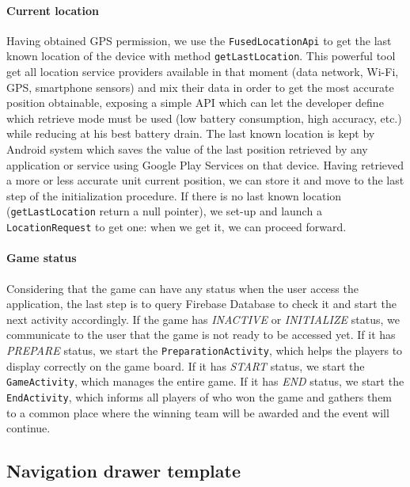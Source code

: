 			\paragraph{Current location}
			
			Having obtained GPS permission, we use the \lstinline|FusedLocationApi| to get the last known location of the device with method \lstinline|getLastLocation|.
			This powerful tool get all location service providers available in that moment (data network, Wi-Fi, GPS, smartphone sensors) and mix their data in order to get the most accurate position obtainable, exposing a simple API which can let the developer define which retrieve mode must be used (low battery consumption, high accuracy, etc.) while reducing at his best battery drain.
			The last known location is kept by Android system which saves the value of the last position retrieved by any application or service using Google Play Services on that device.
			Having retrieved a more or less accurate unit current position, we can store it and move to the last step of the initialization procedure.
			If there is no last known location (\lstinline|getLastLocation| return a null pointer), we set-up and launch a \lstinline|LocationRequest| to get one: when we get it, we can proceed forward.
			
			\paragraph{Game status}
			
			Considering that the game can have any status when the user access the application, the last step is to query Firebase Database to check it and start the next activity accordingly.
			If the game has \emph{INACTIVE} or \emph{INITIALIZE} status, we communicate to the user that the game is not ready to be accessed yet.
			If it has \emph{PREPARE} status, we start the \lstinline|PreparationActivity|, which helps the players to display correctly on the game board.
			If it has \emph{START} status, we start the \lstinline|GameActivity|, which manages the entire game.
			If it has \emph{END} status, we start the \lstinline|EndActivity|, which informs all players of who won the game and gathers them to a common place where the winning team will be awarded and the event will continue.
		
		\subsection{Navigation drawer template}\label{focus:drawer}
		
